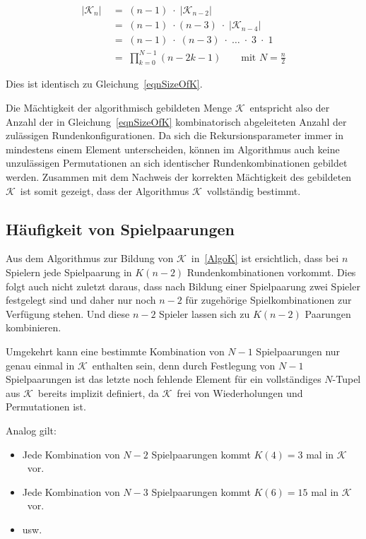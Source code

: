 \documentclass[DIV=15, 10pt]{scrartcl}
\newcommand{\KSet}{$\mathcal{K}$}
\begin{document}
\begin{align}\label{eqnSizeOfK_Alt}
\lvert \mathcal{K}_n \rvert \; &= \; (n-1) \; \cdot \; \lvert \mathcal{K}_{n-2} \rvert \nonumber \\[3mm]
&= \; (n-1) \; \cdot (n - 3) \; \cdot \; \lvert \mathcal{K}_{n-4} \rvert \nonumber \\[3mm]
&= \; (n-1) \; \cdot \; (n - 3) \; \cdot \; \ldots \; \cdot \; 3 \; \cdot \; 1 \nonumber \\[3mm]
&= \; \prod_{k = 0}^{N -1}(n - 2k - 1) \qquad \text{mit }N = \frac{n}{2}
\end{align}

Dies ist identisch zu Gleichung~\eqref{eqnSizeOfK}.

Die Mächtigkeit der algorithmisch gebildeten Menge \KSet\ entspricht also der Anzahl der in Gleichung~\eqref{eqnSizeOfK} kombinatorisch abgeleiteten Anzahl der zulässigen Rundenkonfigurationen. Da sich die Rekursionsparameter immer in mindestens einem Element unterscheiden, können im Algorithmus auch keine unzulässigen Permutationen an sich identischer Rundenkombinationen gebildet werden. Zusammen mit dem Nachweis der korrekten Mächtigkeit des gebildeten \KSet\ ist somit gezeigt, dass der Algorithmus \KSet\ vollständig bestimmt.

\subsection{Häufigkeit von Spielpaarungen}
\label{laHaeufigkeit}

Aus dem Algorithmus zur Bildung von \KSet\ in~\eqref{AlgoK} ist ersichtlich, dass bei $n$ Spielern jede Spielpaarung in $K(n-2)$ Rundenkombinationen vorkommt. Dies folgt auch nicht zuletzt daraus, dass nach Bildung einer Spielpaarung zwei Spieler festgelegt sind und daher nur noch $n-2$ für zugehörige Spielkombinationen zur Verfügung stehen. Und diese $n-2$ Spieler lassen sich zu $K(n-2)$ Paarungen kombinieren.

Umgekehrt kann eine bestimmte Kombination von $N-1$ Spielpaarungen nur genau einmal in \KSet\ enthalten sein, denn durch Festlegung von $N-1$ Spielpaarungen ist das letzte noch fehlende Element für ein vollständiges $N$-Tupel aus \KSet\ bereits implizit definiert, da \KSet\ frei von Wiederholungen und Permutationen ist.

Analog gilt:

\begin{itemize}

\item Jede Kombination von $N-2$ Spielpaarungen kommt $K(4) = 3$ mal in \KSet\ vor.

\item Jede Kombination von $N-3$ Spielpaarungen kommt $K(6) = 15$ mal in \KSet\ vor.

\item usw.
\end{itemize}
\end{document}
